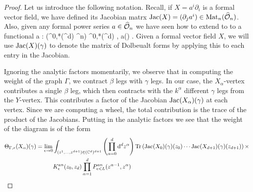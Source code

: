 \documentclass[10pt]{amsart}
\def\Jac{{\rm Jac}}
\begin{document}
\begin{proof}

Let us introduce the following notation. 
Recall, if $X = a^i \partial_i$ is a formal vector field, we have defined its Jacobian matrx $\Jac(X) = (\partial_j a^i) \in {\rm Mat}_n(\hO_n)$.
Also, given any formal power series $a \in \widehat{\mathcal O}_n$ we have seen how to extend to to a functional
\ben
a : \Sym(\Omega^{0,*}(\CC^d) \tensor \CC^n) \to \Omega^{0,*}(\CC^d) \;\; , \;\; \gamma \mapsto a(\gamma) .
\een
Given a formal vector field $X$, we will use $\Jac(X)(\gamma)$ to denote the matrix of Dolbeualt forms by applying this to each entry in the Jacobian.

Ignoring the analytic factors momentarily, 
we observe that in computing the weight of the graph $\Gamma$,
we contract $\beta$ legs with $\gamma$ legs.
In our case, the $X_\alpha$-vertex contributes a single $\beta$ leg,
which then contracts with the $k^\alpha$ different $\gamma$ legs from the $Y$-vertex.
This contributes a factor of the Jacobian ${\rm Jac}(X_\alpha)(\gamma)$ at each vertex.
Since we are computing a wheel, the total contribution is the trace of the product of the Jacobians. 
Putting in the analytic factors we see that the weight of the diagram is of the form
\begin{align*}
\Theta_{\Gamma,e}(X_\alpha) (\gamma) = \lim_{\epsilon \to 0} & \int_{(z^1,\ldots, z^{d+1}) \in (\CC^d)^{d+1}} \left(\prod_{\alpha=0}^d \d^d z^\alpha\right) \Tr\left(\Jac(X_0) (\gamma)(z_0) \cdots \Jac(X_{d+1})(\gamma)(z_{d+1})\right) \times \\
&  K^{an}_\epsilon(z_0,z_d) \prod_{\alpha = 1}^{d} P_{\epsilon < L}^{an}(z^{\alpha-1}, z^{\alpha}) 
\end{align*}


\end{proof}
\end{document}
